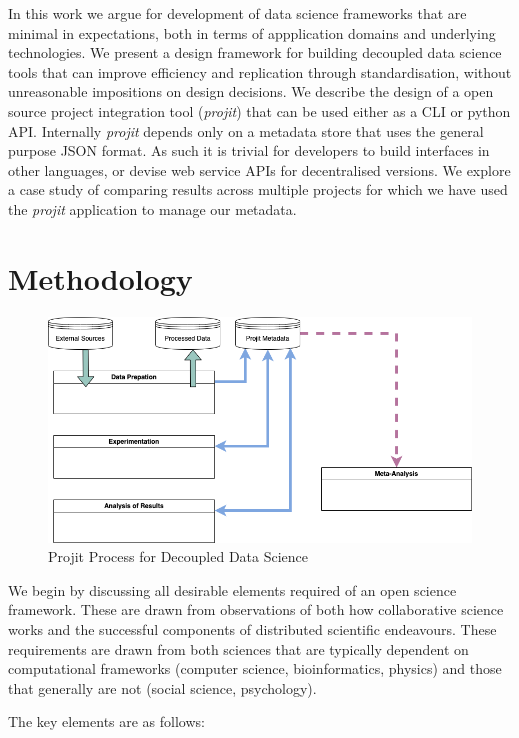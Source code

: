 \documentclass[sigconf]{acmart}
\begin{document}
In this work we argue for development of data science frameworks that are minimal in expectations, both in
terms of appplication domains and underlying technologies. We present a design framework for building
decoupled data science tools that can improve efficiency and replication through standardisation, without
unreasonable impositions on design decisions. We describe the design of a open source project integration
tool (\textit{projit}) that can be used either as a CLI or python API. Internally \textit{projit} depends 
only on a metadata store that uses the general purpose JSON format. 
As such it is trivial for developers to build interfaces in other
languages, or devise web service APIs for decentralised versions. We explore a case study of comparing results
across multiple projects for which we have used the \textit{projit} application to manage our metadata.

\section{Methodology}

\begin{figure}
\includegraphics[scale=0.6]{./Projit_decoupled_process.drawio.png}
\caption{Projit Process for Decoupled Data Science}
\label{fig:projit}
\end{figure}

We begin by discussing all desirable elements required of an open science framework. These are drawn
from observations of both how collaborative science works and the successful components of distributed
scientific endeavours. These requirements are drawn from both sciences that are typically dependent
on computational frameworks (computer science, bioinformatics, physics) and those that generally are not
(social science, psychology).

The key elements are as follows:
\end{document}
